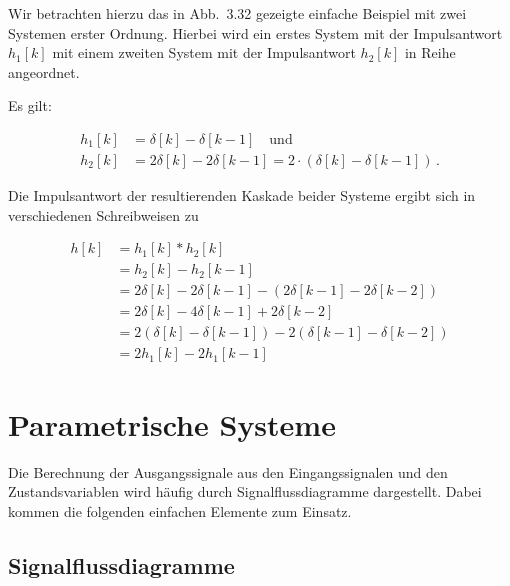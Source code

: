\begin{beispiel}
Wir betrachten hierzu das in Abb.\ 3.32 gezeigte einfache Beispiel mit zwei Systemen erster Ordnung. Hierbei wird ein erstes System mit der Impulsantwort $h_1[k]$ mit einem zweiten System mit der Impulsantwort $h_2[k]$ in Reihe angeordnet.


Es gilt:

\begin{align*}
h_1[k] &= \delta[k] - \delta[k-1] \quad \text{und} \\
h_2[k] &= 2\delta[k] - 2\delta[k-1] = 2\cdot(\delta[k] - \delta[k-1])\,.
\end{align*}

Die Impulsantwort der resultierenden Kaskade beider Systeme ergibt sich in verschiedenen Schreibweisen zu

\begin{align*}
h[k] &= h_1[k] * h_2[k] \\
&= h_2[k] - h_2[k-1] \\
&= 2\delta[k] - 2\delta[k-1] - (2\delta[k-1] - 2\delta[k-2]) \\
&= 2\delta[k] - 4\delta[k-1] + 2\delta[k-2] \\
&= 2(\delta[k] - \delta[k-1]) - 2(\delta[k-1] - \delta[k-2]) \\
&= 2h_1[k] - 2h_1[k-1]
\end{align*}

\end{beispiel}

\section{Parametrische Systeme}
\label{sec:parametrische-systeme}

Die Berechnung der Ausgangssignale aus den Eingangssignalen und den Zustandsvariablen wird häufig durch Signalflussdiagramme dargestellt. Dabei kommen die folgenden einfachen Elemente zum Einsatz.

\subsection{Signalflussdiagramme}
\label{sec:signalflussdiagramme}

